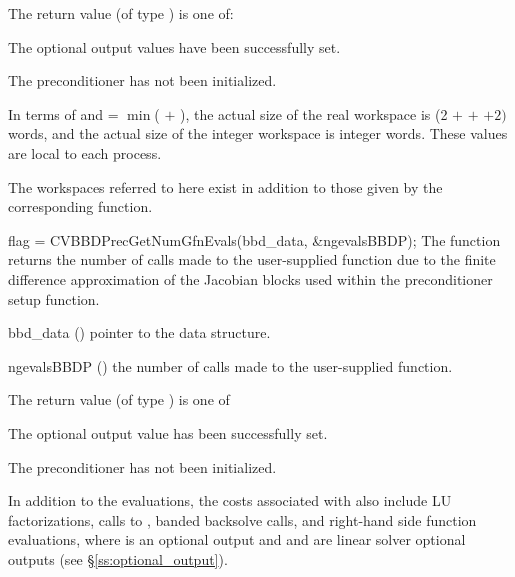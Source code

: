 {
  The return value  (of type ) is one of:
  \begin{args}
  \item[\Id{CVBBDPRE\_SUCCESS}] 
    The optional output values have been successfully set.
  \item[\Id{CVBBDPRE\_PDATA\_NULL}]
    The {\cvbbdpre} preconditioner has not been initialized.
  \end{args}
}
{
  In terms of  and
   = $\min$( $+$ ),
  the actual size of the real workspace is
  (2  $+$  $+$  $+2) \, $
   words, and the actual size of the integer workspace is
   integer words.  These values are local to each process.

  The workspaces referred to here exist in addition to those given by the
  corresponding  function.
}
{
  flag = CVBBDPrecGetNumGfnEvals(bbd\_data, \&ngevalsBBDP);
}
{
  The function  returns the
  number of calls made to the user-supplied  function due to the 
  finite difference approximation of the Jacobian blocks used within
  the preconditioner setup function.
}
{
  \begin{args}[ngevalsBBDP]
  \item[bbd\_data] ()
    pointer to the {\cvbbdpre} data structure.
  \item[ngevalsBBDP] ()
    the number of calls made to the user-supplied  function.
  \end{args}
}
{
  The return value  (of type ) is one of
  \begin{args}
  \item[\Id{CVBBDPRE\_SUCCESS}] 
    The optional output value has been successfully set.
  \item[\Id{CVBBDPRE\_PDATA\_NULL}]
    The {\cvbbdpre} preconditioner has not been initialized.
  \end{args}
}
{}

In addition to the   evaluations,
the costs associated with {\cvbbdpre} also include  LU
factorizations,  calls to ,  banded
backsolve calls, and  right-hand side function evaluations,
where  is an optional {\cvodes} output and  and 
 are linear solver optional outputs (see \S\ref{ss:optional_output}).
